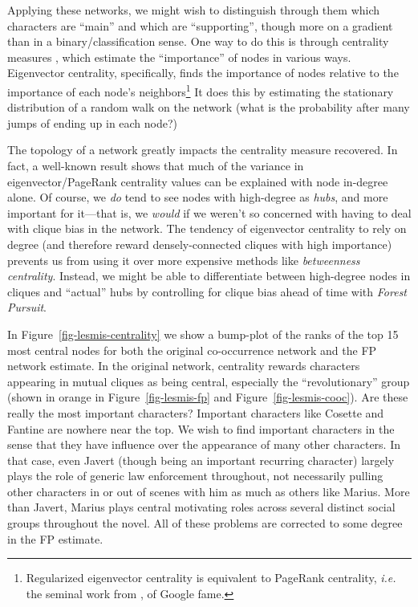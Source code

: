 \documentclass[%
	12pt,
		oneside,
		letterpaper
]{book}
\begin{document}
Applying these networks, we might wish to distinguish through them which characters are ``main'' and which are ``supporting'', though more on a gradient than in a binary/classification sense.
One way to do this is through centrality measures \autocite{Mathematicsnetworks_Newman2018,atlasaspiringnetwork_Coscia2021}, which estimate the ``importance'' of nodes in various ways.
Eigenvector centrality, specifically, finds the importance of nodes relative to the importance of each node's neighbors\footnote{
  Regularized eigenvector centrality is equivalent to PageRank centrality, \emph{i.e.} the seminal work from \autocite{PageRankCitationRanking_Page1999}, of Google fame.}
It does this by estimating the stationary distribution of a random walk on the network (what is the probability after many jumps of ending up in each node?)

The topology of a network greatly impacts the centrality measure recovered.
In fact, a well-known result shows that much of the variance in eigenvector/PageRank centrality values can be explained with node in-degree alone.\autocite{ApproximatingPageRankDegree_Fortunato}
Of course, we \emph{do} tend to see nodes with high-degree as \emph{hubs}, and more important for it---that is, we \emph{would} if we weren't so concerned with having to deal with clique bias in the network.
The tendency of eigenvector centrality to rely on degree (and therefore reward densely-connected cliques with high importance) prevents us from using it over more expensive methods like \emph{betweenness centrality}.
Instead, we might be able to differentiate between high-degree nodes in cliques and ``actual'' hubs by controlling for clique bias ahead of time with \emph{Forest Pursuit}.

In Figure~\ref{fig-lesmis-centrality} we show a bump-plot of the ranks of the top 15 most central nodes for both the original co-occurrence network and the FP network estimate.
In the original network, centrality rewards characters appearing in mutual cliques as being central, especially the ``revolutionary'' group (shown in orange in Figure~\ref{fig-lesmis-fp} and Figure~\ref{fig-lesmis-cooc}).
Are these really the most important characters?
Important characters like Cosette and Fantine are nowhere near the top.
We wish to find important characters in the sense that they have influence over the appearance of many other characters.
In that case, even Javert (though being an important recurring character) largely plays the role of generic law enforcement throughout, not necessarily pulling other characters in or out of scenes with him as much as others like Marius.
More than Javert, Marius plays central motivating roles across several distinct social groups throughout the novel.
All of these problems are corrected to some degree in the FP estimate.
\end{document}
